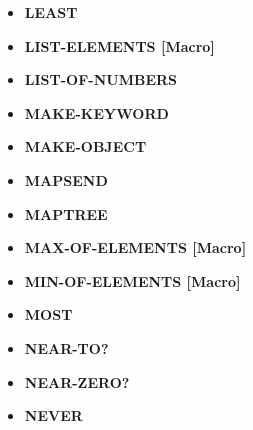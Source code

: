 \documentclass [11pt]{book}
\begin{document}
\begin{itemize}
\item {}
\textbf{LEAST}





\item {}
\textbf{LIST-ELEMENTS [Macro]}





\item {}
\textbf{LIST-OF-NUMBERS}





\item {}
\textbf{MAKE-KEYWORD}





\item {}
\textbf{MAKE-OBJECT}





\item {}
\textbf{MAPSEND}





\item {}
\textbf{MAPTREE}





\item {}
\textbf{MAX-OF-ELEMENTS [Macro]}





\item {}
\textbf{MIN-OF-ELEMENTS [Macro]}





\item {}
\textbf{MOST}





\item {}
\textbf{NEAR-TO?}





\item {}
\textbf{NEAR-ZERO?}





\item {}
\textbf{NEVER}






\end{itemize}
\end{document}
